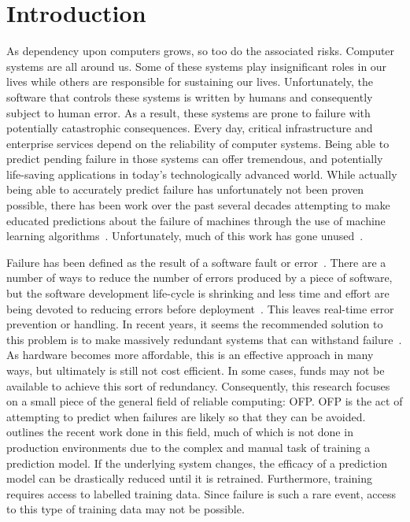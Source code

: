\section{Introduction} \label{chapter1}
As dependency upon computers grows, so too do the associated risks.  Computer
systems are all around us.  Some of these systems play insignificant
roles in our lives while others are responsible for sustaining our lives.
Unfortunately, the software that controls these systems is written by humans
and consequently subject to human error.  As a result, these systems are prone
to failure with potentially catastrophic consequences.  Every day, critical
infrastructure and enterprise services depend on the reliability of computer
systems.  Being able to predict pending failure in those systems can offer
tremendous, and potentially life-saving applications in today's technologically
advanced world.  While actually being able to accurately predict failure has
unfortunately not been proven possible, there has been work over the past
several decades attempting to make educated predictions about the failure of
machines through the use of machine learning algorithms~\citep{salfnerSurvey}.
Unfortunately, much of this work has gone unused~\citep{irrera2015}.  

Failure has been defined as the result of a software fault or
error~\citep{salfnerSurvey}.  There are a number of ways to reduce the number of
errors produced by a piece of software, but the software development life-cycle
is shrinking and less time and effort are being devoted to reducing errors
before deployment~\citep{schmidt2016}.  This leaves real-time error prevention
or handling.  In recent years, it seems the recommended solution to this
problem is to make massively redundant systems that can withstand
failure~\citep{bauer2012}.  As hardware becomes more affordable, this is an
effective approach in many ways, but ultimately is still not cost efficient.
In some cases, funds may not be available to achieve this sort of redundancy.
Consequently, this research focuses on a small piece of the general field of
reliable computing: \ac{OFP}.  \ac{OFP} is the act of attempting to predict
when failures are likely so that they can be avoided.  \citet{salfnerSurvey}
outlines the recent work done in this field, much of which is not done in
production environments due to the complex and manual task of training a
prediction model.  If the underlying system changes, the efficacy of a
prediction model can be drastically reduced until it is retrained.
Furthermore, training requires access to labelled training data.  Since failure
is such a rare event, access to this type of training data may not be possible.  

